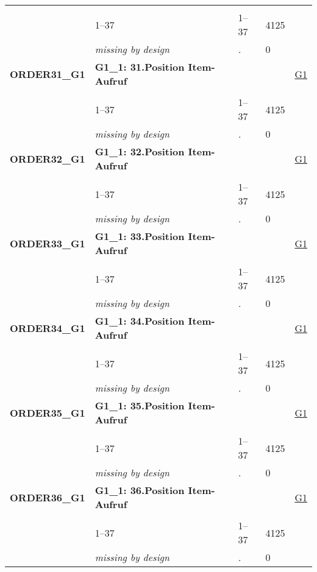 \begin{longtable}{| L{2.65cm} | L{8cm} | C{1.5cm} | R{1.25cm} | C{2.25cm}  |}
   &  &  &  &  \\ 
   & 1--37 & 1--37 & 4125 &  \\ 
   & \textit{missing by design} & \textit{.} & 0 &  \\ 
   \midrule
\textbf{ORDER31\_G1}\label{var:ORDER31:G1} & \textbf{G1\_1: 31.Position Item-Aufruf} &  &  & \hyperref[G1]{G1} \\ 
   &  &  &  &  \\ 
   & 1--37 & 1--37 & 4125 &  \\ 
   & \textit{missing by design} & \textit{.} & 0 &  \\ 
   \midrule
\textbf{ORDER32\_G1}\label{var:ORDER32:G1} & \textbf{G1\_1: 32.Position Item-Aufruf} &  &  & \hyperref[G1]{G1} \\ 
   &  &  &  &  \\ 
   & 1--37 & 1--37 & 4125 &  \\ 
   & \textit{missing by design} & \textit{.} & 0 &  \\ 
   \midrule
\textbf{ORDER33\_G1}\label{var:ORDER33:G1} & \textbf{G1\_1: 33.Position Item-Aufruf} &  &  & \hyperref[G1]{G1} \\ 
   &  &  &  &  \\ 
   & 1--37 & 1--37 & 4125 &  \\ 
   & \textit{missing by design} & \textit{.} & 0 &  \\ 
   \midrule
\textbf{ORDER34\_G1}\label{var:ORDER34:G1} & \textbf{G1\_1: 34.Position Item-Aufruf} &  &  & \hyperref[G1]{G1} \\ 
   &  &  &  &  \\ 
   & 1--37 & 1--37 & 4125 &  \\ 
   & \textit{missing by design} & \textit{.} & 0 &  \\ 
   \midrule
\textbf{ORDER35\_G1}\label{var:ORDER35:G1} & \textbf{G1\_1: 35.Position Item-Aufruf} &  &  & \hyperref[G1]{G1} \\ 
   &  &  &  &  \\ 
   & 1--37 & 1--37 & 4125 &  \\ 
   & \textit{missing by design} & \textit{.} & 0 &  \\ 
   \midrule
\textbf{ORDER36\_G1}\label{var:ORDER36:G1} & \textbf{G1\_1: 36.Position Item-Aufruf} &  &  & \hyperref[G1]{G1} \\ 
   &  &  &  &  \\ 
   & 1--37 & 1--37 & 4125 &  \\ 
   & \textit{missing by design} & \textit{.} & 0 &  \\ 

\end{longtable}
